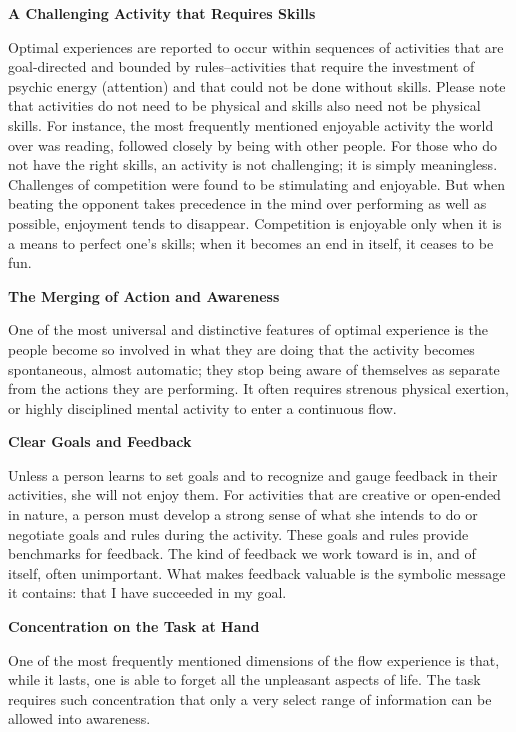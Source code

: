 \textbf{A Challenging Activity that Requires Skills}

Optimal experiences are reported to occur within sequences of activities that are goal-directed and bounded by rules--activities that require the investment of psychic energy (attention) and that could not be done without skills. Please note that activities do not need to be physical and skills also need not be physical skills. For instance, the most frequently mentioned enjoyable activity the world over was reading, followed closely by being with other people. For those who do not have the right skills, an activity is not challenging; it is simply meaningless. Challenges of competition were found to be stimulating and enjoyable. But when beating the opponent takes precedence in the mind over performing as well as possible, enjoyment tends to disappear. Competition is enjoyable only when it is a means to perfect one's skills; when it becomes an end in itself, it ceases to be fun.


\textbf{The Merging of Action and Awareness}

One of the most universal and distinctive features of optimal experience is the people become so involved in what they are doing that the activity becomes spontaneous, almost automatic; they stop being aware of themselves as separate from the actions they are performing. It often requires strenous physical exertion, or highly disciplined mental activity to enter a continuous flow.

\textbf{Clear Goals and Feedback}

Unless a person learns to set goals and to recognize and gauge feedback in their activities, she will not enjoy them. For activities that are creative or open-ended in nature, a person must develop a strong sense of what she intends to do or negotiate goals and rules during the activity. These goals and rules provide benchmarks for feedback. The kind of feedback we work toward is in, and of itself, often unimportant. What makes feedback valuable is the symbolic message it contains: that I have succeeded in my goal.

\textbf{Concentration on the Task at Hand}

One of the most frequently mentioned dimensions of the flow experience is that, while it lasts, one is able to forget all the unpleasant aspects of life. The task requires such concentration that only a very select range of information can be allowed into awareness.

